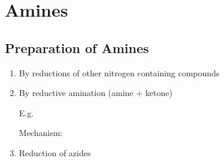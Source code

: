 \section{Amines}

\subsection{Preparation of Amines}

\begin{enumerate}[label=\alph*)]

	\item By reductions of other nitrogen containing compounds

	\item By reductive amination (amine + ketone)


		E.g.


		Mechanism:


	\item Reduction of azides

\end{enumerate}
